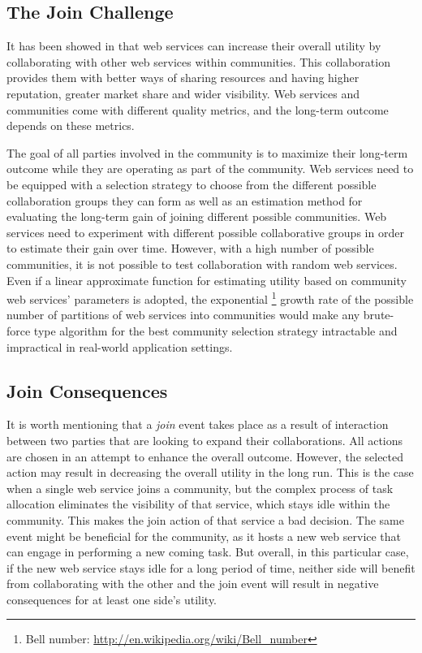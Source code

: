 \documentclass[11pt,onecolumn]{IEEEtran}
\begin{document}
\subsection{The Join Challenge}\label{s:tjc} 
It has been showed in \cite{10.1109/ARES.2008.7,10.1109/TSC.2012.12,journal-community-formation} that web services can increase their overall utility by collaborating with other web services within communities. This collaboration provides them with better ways of sharing resources and having higher reputation, greater market share and wider visibility. Web services and communities come with different quality metrics, and the long-term outcome depends on these metrics. 

The goal of all parties involved in the community is to maximize their long-term outcome while they are operating as part of the community. Web services need to be equipped with a selection strategy to choose from the different possible collaboration groups they can form as well as an estimation method for evaluating the long-term gain of joining different possible communities. Web services need to experiment with different possible collaborative groups in order to estimate their gain over time. However, with a high number of possible communities, it is not possible to test collaboration with random web services. Even if a linear approximate function for estimating utility based on community web services' parameters is adopted, the exponential \footnote{Bell number: \url{http://en.wikipedia.org/wiki/Bell\_number}} growth rate of the possible number of partitions of web services into communities would make any brute-force type algorithm for the best community selection strategy intractable and impractical in real-world application settings.

\subsection{Join Consequences}\label{s:jc}
It is worth mentioning that a \emph{join} event takes place as a result of interaction between two parties that are looking to expand their collaborations. All actions are chosen in an attempt to enhance the overall outcome. However, the selected action may result in decreasing the overall utility in the long run. 
This is the case when a single web service joins a community, but the complex process of task allocation eliminates the visibility of that service, which stays idle within the community. This makes the join action of that service a bad decision. The same event might be beneficial for the community, as it hosts a new web service that can engage in performing a new coming task. But overall, in this particular case, if the new web service stays idle for a long period of time, neither side will benefit from collaborating with the other and the join event will result in negative consequences for at least one side's utility. 
\end{document}
